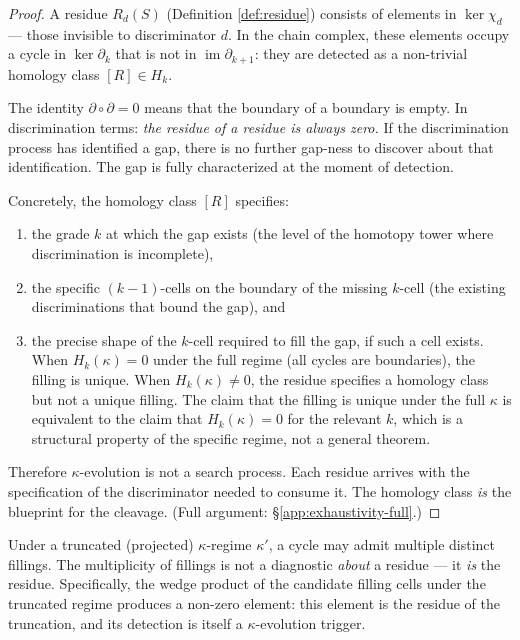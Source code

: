 \begin{proof}
A residue $R_d(S)$ (Definition \ref{def:residue}) consists of
elements in $\ker \chi_d$ --- those invisible to discriminator
$d$. In the chain complex, these elements occupy a cycle in
$\ker \partial_k$ that is not in $\operatorname{im} \partial_{k+1}$:
they are detected as a non-trivial homology class $[R] \in H_k$.

The identity $\partial \circ \partial = 0$ means that the
boundary of a boundary is empty. In discrimination terms:
\emph{the residue of a residue is always zero.} If the
discrimination process has identified a gap, there is no
further gap-ness to discover about that identification. The
gap is fully characterized at the moment of detection.

Concretely, the homology class $[R]$ specifies:
\begin{enumerate}[label=(\roman*),nosep]
  \item the grade $k$ at which the gap exists (the level of
    the homotopy tower where discrimination is incomplete),
  \item the specific $(k-1)$-cells on the boundary of the
    missing $k$-cell (the existing discriminations that
    bound the gap), and
  \item the precise shape of the $k$-cell required to fill
    the gap, if such a cell exists. When $H_k(\kappa) = 0$
    under the full regime (all cycles are boundaries),
    the filling is unique. When $H_k(\kappa) \neq 0$,
    the residue specifies a homology class but not a
    unique filling. The claim that the filling is unique
    under the full $\kappa$ is equivalent to the claim
    that $H_k(\kappa) = 0$ for the relevant $k$, which
    is a structural property of the specific regime,
    not a general theorem.
\end{enumerate}

Therefore $\kappa$-evolution is not a search process. Each
residue arrives with the specification of the discriminator
needed to consume it. The homology class \emph{is} the
blueprint for the cleavage. (Full argument: \S\ref{app:exhaustivity-full}.)
\end{proof}

\begin{corollary}
\label{cor:truncation-ambiguity}
Under a truncated (projected) $\kappa$-regime $\kappa'$,
a cycle may admit multiple distinct fillings. The
multiplicity of fillings is not a diagnostic \emph{about}
a residue --- it \emph{is} the residue. Specifically, the
wedge product of the candidate filling cells under the
truncated regime produces a non-zero element: this element
is the residue of the truncation, and its detection is
itself a $\kappa$-evolution trigger.
\end{corollary}


